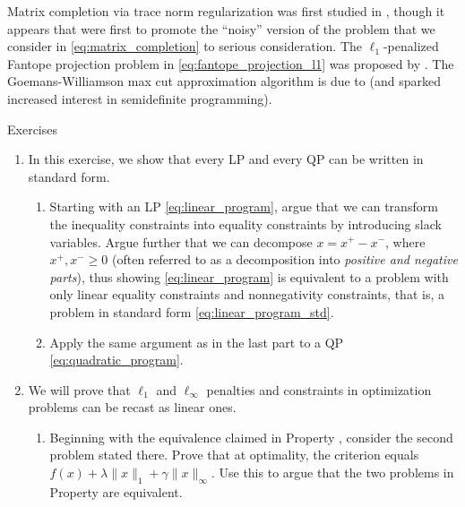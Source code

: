 Matrix completion via trace norm regularization was first studied in
\cite{candes2009exact, candes2010power}, though it appears that
\cite{mazumder2010spectral} were first to promote the ``noisy'' version of the
problem that we consider in \eqref{eq:matrix_completion} to serious
consideration. The $\ell_1$-penalized Fantope projection problem in
\eqref{eq:fantope_projection_l1} was proposed by \cite{vu2013fantope}. The
Goemans-Williamson max cut approximation algorithm is due to
\cite{goemans1995improved} (and sparked increased interest in semidefinite
programming). 

\clearpage

\begin{xcb}{Exercises}
\begin{enumerate}[label=\thechapter.\arabic*]
\settowidth{\leftmargini}{0.00.\hskip\labelsep}
\item \label{ex:linear_quadratic_std} 
  In this exercise, we show that every LP and every QP can be written in
  standard form.  

\begin{enumerate}[label=\alph*.]
\item Starting with an LP \eqref{eq:linear_program}, argue that we can transform  
  the inequality constraints into equality constraints by introducing slack
  variables. Argue further that we can decompose $x = x^+ - x^-$, where $x^+, 
  x^- \geq 0$ (often referred to as a decomposition into \emph{positive and
    negative parts}), thus showing \eqref{eq:linear_program} is equivalent to a
  problem with only linear equality constraints and nonnegativity constraints, 
  that is, a problem in standard form \eqref{eq:linear_program_std}.    

\item Apply the same argument as in the last part to a QP
  \eqref{eq:quadratic_program}.
\end{enumerate}

\item \label{ex:l1_linf_linear} 
  We will prove that $\ell_1$ and $\ell_\infty$ penalties and constraints in
  optimization problems can be recast as linear ones.  

\begin{enumerate}[label=\alph*.]
\item Beginning with the equivalence claimed in Property
  , consider the second problem stated there. Prove
  that at optimality, the criterion equals $f(x) + \lambda \|x\|_1 + \gamma
  \|x\|_\infty$. Use this to argue that the two problems in Property
   are equivalent.  


\end{enumerate}
\end{enumerate}
\end{xcb}
